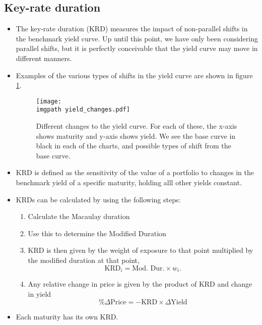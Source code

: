 \documentclass[../notes_compiled.tex]{subfiles}
\begin{document}
\subsection{Key-rate duration}
\begin{itemize}
\item The key-rate duration (KRD) measures the impact of non-parallel shifts in the benchmark yield curve. Up until this point, we have only been considering parallel shifts, but it is perfectly conceivable that the yield curve may move in different manners.
\item Examples of the various types of shifts in the yield curve are shown in figure \ref{fig-yield-shifts}.

\begin{figure}[h]
  \centering
  \texttt{[image: \\imgpath yield\_changes.pdf]}
  \caption{Different changes to the yield curve. For each of these, the x-axis shows maturity and y-axis shows yield. We see the base curve in black in each of the charts, and possible types of shift from the base curve.}
  \label{fig-yield-shifts}
\end{figure}

\item KRD is defined as the sensitivity of the value of a portfolio to changes in the benchmark yield of a specific maturity, holding alll other yields constant.

\item KRDs can be calculated by using the following steps:
\begin{enumerate}
\item Calculate the Macaulay duration
\item Use this to determine the Modified Duration
\item KRD is then given by the weight of exposure to that point multiplied by the modified duration at that point,
\begin{equation}
\text{KRD}_{i} = \text{Mod. Dur.} \times w_{i}.
\end{equation}
\item Any relative change in price is given by the product of KRD and change in yield
\begin{equation}
\%\Delta\text{Price} = -\text{KRD}\times\Delta\text{Yield}
\end{equation}
\end{enumerate}

\item Each maturity has its own KRD.


\end{itemize}
\end{document}
